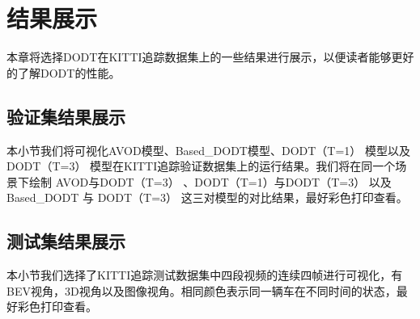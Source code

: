 
\chapter{结果展示}
\label{ch:results}

本章将选择DODT在KITTI追踪数据集上的一些结果进行展示，以便读者能够更好的了解DODT的性能。

\section{验证集结果展示}
\label{val_results}
本小节我们将可视化AVOD模型、Based\_DODT模型、DODT（T=1） 模型以及DODT（T=3） 模型在KITTI追踪验证数据集上的运行结果。我们将在同一个场景下绘制 AVOD与DODT（T=3） 、DODT（T=1）与DODT（T=3） 以及Based\_DODT 与 DODT（T=3）  这三对模型的对比结果，最好彩色打印查看。

\section{测试集结果展示}
\label{test_results}

本小节我们选择了KITTI追踪测试数据集中四段视频的连续四帧进行可视化，有BEV视角，3D视角以及图像视角。相同颜色表示同一辆车在不同时间的状态，最好彩色打印查看。



\ifprint
	\newpage
	\thispagestyle{empty}
	\mbox{}
	
	\clearpage
	\setcounter{page}{10}
\fi
